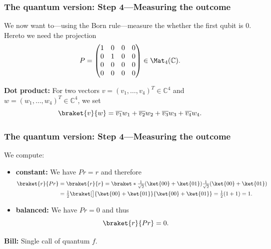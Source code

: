 \documentclass[aspectratio=169, 12pt, final, professionalfont]{beamer}
\begin{document}
\begin{frame}\frametitle{The quantum version: Step 4---Measuring the outcome}
  We now want to---using the Born rule---measure the whether the first qubit is \(0\).
  Hereto we need the projection
  \begin{align*}
    P =
    \begin{pmatrix}
      1 & 0 & 0 & 0 \\
      0 & 1 & 0 & 0 \\
      0 & 0 & 0 & 0 \\
      0 & 0 & 0 & 0
    \end{pmatrix} \in \Mat_{4}( \mathbb{C}).
  \end{align*}

   \textbf{Dot product:}
  For two vectors \(v= (v_{1}, \dots , v_{4})^{T} \in \mathbb{C}^{4} \) and \(w = (w_{1}, \dots , w_{4})^{T} \in \mathbb{C}^{4}\), we set
  \begin{equation*}
    \braket{v}{w} = \overline{v_{1}} w_{1} + \overline{v_{2}}{w_{2}} + \overline{v_{3}}{w_{3}} + \overline{v_{4}}{w_{4}}.
  \end{equation*}
\end{frame}

\begin{frame}\frametitle{The quantum version: Step 4---Measuring the outcome}
   We compute:
  \begin{itemize}
     \item \textbf{constant:} We have \(Pr = r\) and therefore
     \begin{align*}
       \braket{r}{Pr}
       & = \braket{r}{r} = \braket*{\tfrac{1}{\sqrt{2}} ( \ket{00} + \ket{01})}{\tfrac{1}{\sqrt{2}} ( \ket{00} + \ket{01})} \\
       & = \tfrac{1}{2} \braket[\big]{\ket{00} + \ket{01}}{\ket{00} + \ket{01}}
       = \tfrac{1}{2}( 1+ 1) = 1.
     \end{align*}
     \item \textbf{balanced:} We have \(Pr = 0\) and thus
     \begin{equation*}
       \braket{r}{Pr} =0.
     \end{equation*}
   \end{itemize}

   \textbf{Bill:} Single call of quantum \(f\).
\end{frame}
\end{document}
